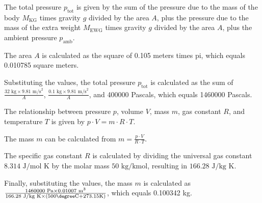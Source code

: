 The total pressure \( p_{\text{tot}} \) is given by the sum of the pressure due to the mass of the body \( M_{\text{KG}} \) times gravity \( g \) divided by the area \( A \), plus the pressure due to the mass of the extra weight \( M_{\text{EWG}} \) times gravity \( g \) divided by the area \( A \), plus the ambient pressure \( p_{\text{amb}} \).

The area \( A \) is calculated as the square of 0.105 meters times pi, which equals 0.010785 square meters.

Substituting the values, the total pressure \( p_{\text{tot}} \) is calculated as the sum of \( \frac{32 \text{ kg} \times 9.81 \text{ m/s}^2}{A} \), \( \frac{0.1 \text{ kg} \times 9.81 \text{ m/s}^2}{A} \), and 400000 Pascals, which equals 1460000 Pascals.

The relationship between pressure \( p \), volume \( V \), mass \( m \), gas constant \( R \), and temperature \( T \) is given by \( p \cdot V = m \cdot R \cdot T \).

The mass \( m \) can be calculated from \( m = \frac{p \cdot V}{R \cdot T} \).

The specific gas constant \( R \) is calculated by dividing the universal gas constant \( 8.314 \text{ J/mol K} \) by the molar mass \( 50 \text{ kg/kmol} \), resulting in \( 166.28 \text{ J/kg K} \).

Finally, substituting the values, the mass \( m \) is calculated as \( \frac{1460000 \text{ Pa} \times 0.01007 \text{ m}^3}{166.28 \text{ J/kg K} \times (500 \degree \text{C} + 273.15 \text{K})} \), which equals 0.100342 kg.